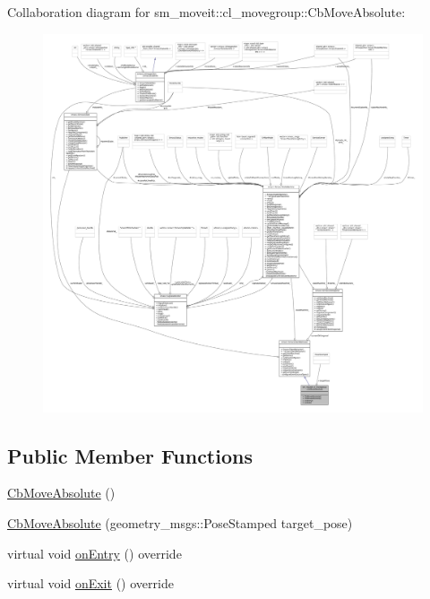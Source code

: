 Collaboration diagram for sm\+\_\+moveit\+:\+:cl\+\_\+movegroup\+:\+:Cb\+Move\+Absolute\+:
\nopagebreak
\begin{figure}[H]
\begin{center}
\leavevmode
\includegraphics[width=350pt]{classsm__moveit_1_1cl__movegroup_1_1CbMoveAbsolute__coll__graph}
\end{center}
\end{figure}
\subsection*{Public Member Functions}
\begin{DoxyCompactItemize}
\item 
\hyperlink{classsm__moveit_1_1cl__movegroup_1_1CbMoveAbsolute_ac5f4f62028add1d559debec021dbdae6}{Cb\+Move\+Absolute} ()
\item 
\hyperlink{classsm__moveit_1_1cl__movegroup_1_1CbMoveAbsolute_a88a650615f4f24502e8089026c6298d0}{Cb\+Move\+Absolute} (geometry\+\_\+msgs\+::\+Pose\+Stamped target\+\_\+pose)
\item 
virtual void \hyperlink{classsm__moveit_1_1cl__movegroup_1_1CbMoveAbsolute_a66a5d0f28cb484295952bb77a8d9123c}{on\+Entry} () override
\item 
virtual void \hyperlink{classsm__moveit_1_1cl__movegroup_1_1CbMoveAbsolute_a262f2972df0b79690c29334e7c594732}{on\+Exit} () override
\end{DoxyCompactItemize}
